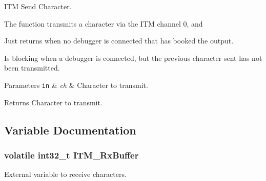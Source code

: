 I\-T\-M Send Character. 

The function transmits a character via the I\-T\-M channel 0, and \begin{DoxyItemize}
\item Just returns when no debugger is connected that has booked the output. \item Is blocking when a debugger is connected, but the previous character sent has not been transmitted.\end{DoxyItemize}

\begin{DoxyParams}[1]{Parameters}
\mbox{\tt in}  & {\em ch} & Character to transmit.\\
\hline
\end{DoxyParams}
\begin{DoxyReturn}{Returns}
Character to transmit. 
\end{DoxyReturn}


\subsection{Variable Documentation}
\hypertarget{group__CMSIS__core__DebugFunctions_ga12e68e55a7badc271b948d6c7230b2a8}{
\subsubsection[{I\-T\-M\-\_\-\-Rx\-Buffer}]{\setlength{\rightskip}{0pt plus 5cm}volatile int32\-\_\-t I\-T\-M\-\_\-\-Rx\-Buffer}}\label{group__CMSIS__core__DebugFunctions_ga12e68e55a7badc271b948d6c7230b2a8}
External variable to receive characters. 